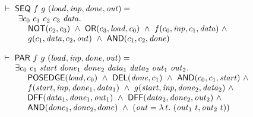\begin{footnotesize}
\smallskip

$
\begin{array}{l}
\TURNST\ \DEF{SEQ}\ f\ g\ (\VAR{load,inp,done,out}) = \\
\phantom{\TURNST\ ~~} \exists c_0~ c_1~ c_2~ c_3~ \VAR{data}.\\
\phantom{\TURNST\ ~~\exists~}                      \DEF{NOT} (c_2,c_3) \ \AND \ 
                      \DEF{OR} (c_3,\VAR{load},c_0) \ \AND \  f (c_0,\VAR{inp},c_1,\VAR{data}) \ \AND \\
\phantom{\TURNST\ ~~ \exists~} 
        g (c_1,\VAR{data},c_2,\VAR{out})\ \AND\ 
        \DEF{AND} (c_1,c_2,\VAR{done}) 
\end{array}
$

\smallskip

$
\begin{array}{l}
\TURNST\ \DEF{PAR}\ f\ g\ (\VAR{load,inp,done,out}) = \\
\phantom{\TURNST\ ~}     \exists c_0~c_1~\VAR{start}~\sVAR{done}{1}~\sVAR{done}{2}~
                                 \sVAR{data}{1}~\sVAR{data}{2}~\sVAR{out}{1}~\sVAR{out}{2}.\\
\phantom{\TURNST\ ~~ \exists~}
       \DEF{POSEDGE} (\VAR{load},c_0)\ \AND\  
       \DEF{DEL} (\VAR{done},c_1)\ \AND \ 
       \DEF{AND} (c_0,c_1,\VAR{start})\ \AND\\
\phantom{\TURNST\ ~~ \exists~}
       f (\VAR{start},\VAR{inp},\sVAR{done}{1},\sVAR{data}{1})\ \AND \ 
       g (\VAR{start},\VAR{inp},\sVAR{done}{2},\sVAR{data}{2})\ \AND\\
\phantom{\TURNST\ ~~ \exists~}
       \DEF{DFF} (\sVAR{data}{1},\sVAR{done}{1},\sVAR{out}{1})\ \AND \  
       \DEF{DFF} (\sVAR{data}{2},\sVAR{done}{2},\sVAR{out}{2})\ \AND\\
\phantom{\TURNST\ ~~ \exists~}
       \DEF{AND} (\sVAR{done}{1},\sVAR{done}{2},done)\ \AND \ 
       (\VAR{out} = \LAMBDA{t}{(\sVAR{out}{1}\ t,\sVAR{out}{2}\ t)})
\end{array}
$

\smallskip


\end{footnotesize}
